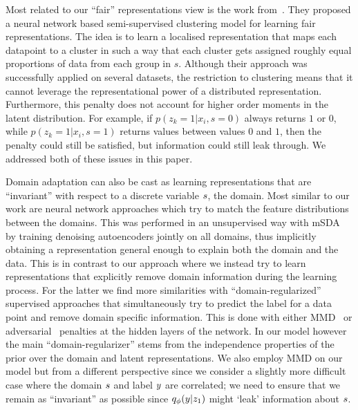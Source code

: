 Most related to our ``fair'' representations view is the work from~\cite{zemel2013learning}. They proposed a neural network based semi-supervised clustering model for learning fair representations. The idea is to learn a localised representation that maps each datapoint to a cluster in such a way that each cluster gets assigned roughly equal proportions of data from each group in $s$. Although their approach was successfully applied on several datasets, the restriction to clustering means that it cannot leverage the representational power of a distributed representation. Furthermore, this penalty does not account for higher order moments in the latent distribution. For example, if $p(z_k=1 | x_i, s=0)$ always returns $1$ or $0$, while $p(z_k=1 | x_i, s=1)$ returns values between values $0$ and $1$, then the penalty could still be satisfied, but information could still leak through. We addressed both of these issues in this paper.

Domain adaptation can also be cast as learning representations that are ``invariant'' with respect to a discrete variable $\*s$, the domain. Most similar to our work are neural network approaches which try to match the feature distributions between the domains. This was performed in an unsupervised way with mSDA~\citep{chen2012marginalized} by training denoising autoencoders jointly on all domains, thus implicitly obtaining a representation general enough to explain both the domain and the data. This is in contrast to our approach where we instead try to learn representations that explicitly remove domain information during the learning process. For the latter we find more similarities with ``domain-regularized'' supervised approaches that simultaneously try to predict the label for a data point and remove domain specific information. This is done with either MMD~\citep{long2015learning, DBLP:journals/corr/TzengHZSD14} or adversarial~\citep{2015arXiv150507818G} penalties at the hidden layers of the network. In our model however the main ``domain-regularizer'' stems from the independence properties of the prior over the domain and latent representations. We also employ MMD on our model but from a different perspective since we consider a slightly more difficult case where the domain $\*s$ and label $\*y$ are correlated; we need to ensure that we remain as ``invariant'' as possible since $q_\phi(\*y|\*z_1)$ might `leak' information about $\*s$. 
